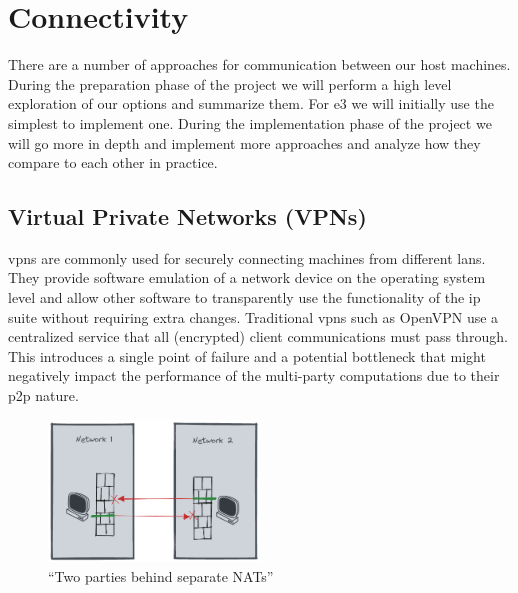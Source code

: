 \hypertarget{connectivity}{%
\section{Connectivity}\label{connectivity}}

There are a number of approaches for communication between our host
machines. During the preparation phase of the project we will perform a
high level exploration of our options and summarize them. For \gls{e3}
we will initially use the simplest to implement one. During the
implementation phase of the project we will go more in depth and
implement more approaches and analyze how they compare to each other in
practice.

\hypertarget{virtual-private-networks-vpns}{%
\subsection{Virtual Private Networks
(VPNs)}\label{virtual-private-networks-vpns}}

\glspl{vpn} are commonly used for securely connecting machines from
different \glspl{lan}. They provide software emulation of a network
device on the operating system level and allow other software to
transparently use the functionality of the \gls{ip} suite without
requiring extra changes. Traditional \glspl{vpn} such as
OpenVPN\autocite{openVPNDocs} use a centralized service that all
(encrypted) client communications must pass through. This introduces a
single point of failure and a potential bottleneck that might negatively
impact the performance of the multi-party computations due to their
\gls{p2p} nature.

\begin{figure}
\centering
\includegraphics[width=0.5\textwidth,height=0.25\textheight]{prep/../figures/nat-intro.png}
\caption{``Two parties behind separate NATs''\label{nat-intro}}
\end{figure}

